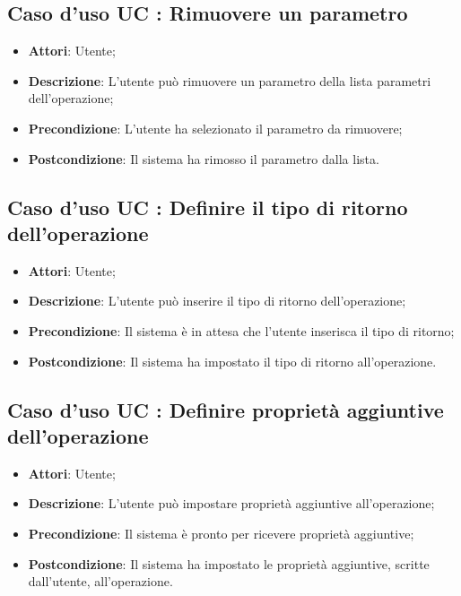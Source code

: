 \documentclass[../AnalisiDeiRequisiti.tex]{subfiles}
\begin{document}
		\subsection{Caso d'uso UC : Rimuovere un parametro}
			\begin{itemize}
				\item \textbf{Attori}: Utente;
				\item \textbf{Descrizione}: L'utente può rimuovere un parametro della lista
				parametri dell'operazione;
				\item \textbf{Precondizione}: L'utente ha selezionato il parametro da
				rimuovere;
				\item \textbf{Postcondizione}: Il sistema ha rimosso il parametro dalla lista.
			\end{itemize}
		\subsection{Caso d'uso UC : Definire il tipo di ritorno dell'operazione}
			\begin{itemize}
				\item \textbf{Attori}: Utente;
				\item \textbf{Descrizione}: L'utente può inserire il tipo di ritorno
				dell'operazione;
				\item \textbf{Precondizione}: Il sistema è in attesa che l'utente inserisca
				il tipo di ritorno;
				\item \textbf{Postcondizione}: Il sistema ha impostato il tipo di ritorno
				all'operazione.
			\end{itemize}
		\subsection{Caso d'uso UC : Definire proprietà aggiuntive dell'operazione}
			\begin{itemize}
				\item \textbf{Attori}: Utente;
				\item \textbf{Descrizione}: L'utente può impostare proprietà aggiuntive
				all'operazione;
				\item \textbf{Precondizione}: Il sistema è pronto per ricevere proprietà
				aggiuntive;
				\item \textbf{Postcondizione}: Il sistema ha impostato le proprietà
				aggiuntive, scritte dall'utente, all'operazione.
			\end{itemize}
\end{document}
